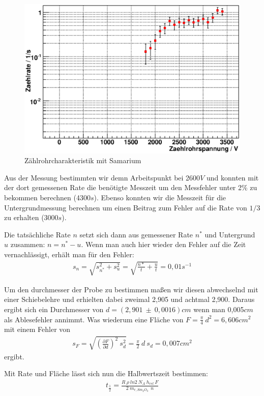 \documentclass[12pt]{article}
\begin{document}
\begin{figure}[H]  
\centering
\includegraphics[width=0.9\linewidth]{pictures/char_sam.eps}
\caption{Zählrohrcharakteristik mit Samarium}
\end{figure}

Aus der Messung bestimmten wir demn Arbeitspunkt bei 2600$V$ und konnten mit der dort gemessenen Rate die benötigte Messzeit um den Messfehler unter
2\% zu bekommen berechnen (4300$s$). Ebenso konnten wir die Messzeit für die Untergrundmessung berechnen um einen Beitrag zum Fehler auf die Rate
von $1/3$ zu erhalten (3000$s$).

Die tatsächliche Rate $n$ setzt sich dann aus gemessener Rate $n^*$ und Untergrund $u$ zusammen: $n = n^* - u$. Wenn man auch hier wieder den Fehler auf
die Zeit vernachlässigt, erhält man für den Fehler:
\begin{align}
 s_n = \sqrt{s_{n^*}^2 + s_u^2} = \sqrt{\frac{n*}{t} + \frac{u}{t}} = 0,01 s^{-1}
\end{align}

Um den durchmesser der Probe zu bestimmen maßen wir diesen abwechselnd mit einer Schiebelehre und erhielten dabei zweimal 2,905 und achtmal 2,900.
Daraus ergibt sich ein Durchmesser von $d = (2,901~ \pm~ 0,0016)cm$ wenn man 0,005$cm$ als Ablesefehler annimmt. Was wiederum eine Fläche von
$F = \frac{\pi}{4}~d^2 = 6,606 cm^2$ mit einem Fehler von
\begin{align}
 s_F = \sqrt{\left(\frac{\partial F}{\partial d}\right)^2~s_d^2} = \frac{\pi}{2}~d~s_d = 0,007 cm^2
\end{align}
ergibt.

Mit Rate und Fläche lässt sich nun die Halbwertszeit bestimmen:
\begin{align}
 t_{\frac{1}{2}} = \frac{R~\rho~ln 2 ~ N_A ~ h_{rel} ~ F}{2~m_{r,Sm_2O_3}~~n}
\end{align}
\end{document}
